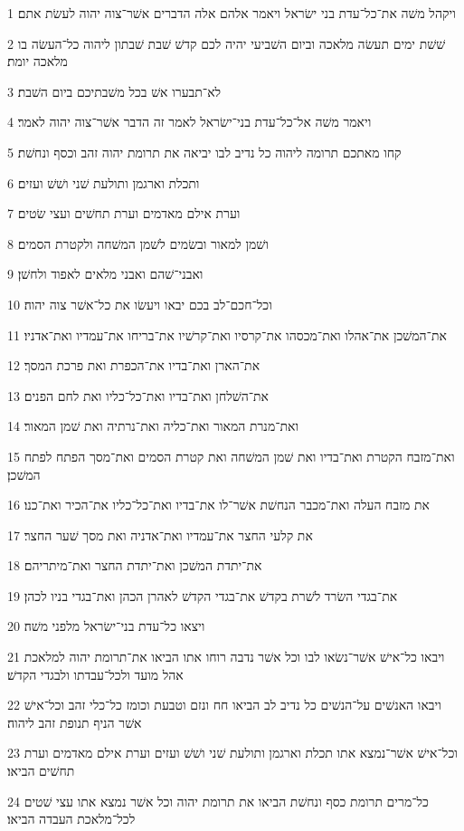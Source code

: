 \par 1 ויקהל משׁה את־כל־עדת בני ישׂראל ויאמר אלהם אלה הדברים אשׁר־צוה יהוה לעשׂת אתם׃
\par 2 שׁשׁת ימים תעשׂה מלאכה וביום השׁביעי יהיה לכם קדשׁ שׁבת שׁבתון ליהוה כל־העשׂה בו מלאכה יומת׃
\par 3 לא־תבערו אשׁ בכל משׁבתיכם ביום השׁבת׃
\par 4 ויאמר משׁה אל־כל־עדת בני־ישׂראל לאמר זה הדבר אשׁר־צוה יהוה לאמר׃
\par 5 קחו מאתכם תרומה ליהוה כל נדיב לבו יביאה את תרומת יהוה זהב וכסף ונחשׁת׃
\par 6 ותכלת וארגמן ותולעת שׁני ושׁשׁ ועזים׃
\par 7 וערת אילם מאדמים וערת תחשׁים ועצי שׂטים׃
\par 8 ושׁמן למאור ובשׂמים לשׁמן המשׁחה ולקטרת הסמים׃
\par 9 ואבני־שׁהם ואבני מלאים לאפוד ולחשׁן׃
\par 10 וכל־חכם־לב בכם יבאו ויעשׂו את כל־אשׁר צוה יהוה׃
\par 11 את־המשׁכן את־אהלו ואת־מכסהו את־קרסיו ואת־קרשׁיו את־בריחו את־עמדיו ואת־אדניו׃
\par 12 את־הארן ואת־בדיו את־הכפרת ואת פרכת המסך׃
\par 13 את־השׁלחן ואת־בדיו ואת־כל־כליו ואת לחם הפנים׃
\par 14 ואת־מנרת המאור ואת־כליה ואת־נרתיה ואת שׁמן המאור׃
\par 15 ואת־מזבח הקטרת ואת־בדיו ואת שׁמן המשׁחה ואת קטרת הסמים ואת־מסך הפתח לפתח המשׁכן׃
\par 16 את מזבח העלה ואת־מכבר הנחשׁת אשׁר־לו את־בדיו ואת־כל־כליו את־הכיר ואת־כנו׃
\par 17 את קלעי החצר את־עמדיו ואת־אדניה ואת מסך שׁער החצר׃
\par 18 את־יתדת המשׁכן ואת־יתדת החצר ואת־מיתריהם׃
\par 19 את־בגדי השׂרד לשׁרת בקדשׁ את־בגדי הקדשׁ לאהרן הכהן ואת־בגדי בניו לכהן׃
\par 20 ויצאו כל־עדת בני־ישׂראל מלפני משׁה׃
\par 21 ויבאו כל־אישׁ אשׁר־נשׂאו לבו וכל אשׁר נדבה רוחו אתו הביאו את־תרומת יהוה למלאכת אהל מועד ולכל־עבדתו ולבגדי הקדשׁ׃
\par 22 ויבאו האנשׁים על־הנשׁים כל נדיב לב הביאו חח ונזם וטבעת וכומז כל־כלי זהב וכל־אישׁ אשׁר הניף תנופת זהב ליהוה׃
\par 23 וכל־אישׁ אשׁר־נמצא אתו תכלת וארגמן ותולעת שׁני ושׁשׁ ועזים וערת אילם מאדמים וערת תחשׁים הביאו׃
\par 24 כל־מרים תרומת כסף ונחשׁת הביאו את תרומת יהוה וכל אשׁר נמצא אתו עצי שׁטים לכל־מלאכת העבדה הביאו׃
